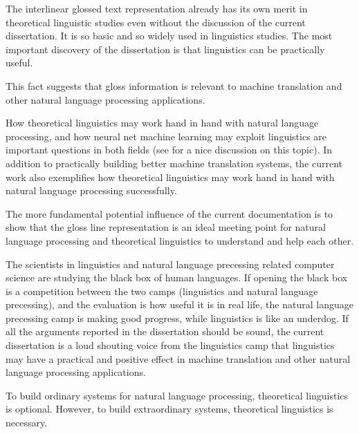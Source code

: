 \documentclass[final]{ua-thesis}
\numberwithin{equation}{section}
\begin{document}
The interlinear glossed text representation already has its own merit in theoretical linguistic studies even without the discussion of the current dissertation. It is so basic and so widely used in linguistics studies. The most important discovery of the dissertation is that linguistics can be practically useful.

This fact suggests that gloss information is relevant to machine translation and other natural language processing applications. 

How theoretical linguistics may work hand in hand with natural language processing, and how neural net machine learning may exploit linguistics are important questions in both fields (see \citet{pater2017generative} for a nice discussion on this topic). In addition to practically building better machine translation systems, the current work also exemplifies how theoretical linguistics may work hand in hand with natural language processing successfully.

The more fundamental potential influence of the current documentation is to show that the gloss line representation is an ideal meeting point for natural language processing and theoretical linguistics to understand and help each other. 

The scientists in linguistics and natural language precessing related computer science are studying the black box of human languages. 
If opening the black box is a competition between the two camps (linguistics and natural language precessing), and the evaluation is how useful it is in real life, the natural language precessing camp is making good progress, while linguistics is like an underdog. 
If all the arguments reported in the dissertation should be sound, the current dissertation is a loud shouting voice from the linguistics camp that linguistics may have a practical and positive effect in machine translation and other natural language processing applications. 

To build ordinary systems for natural language processing, theoretical linguistics is optional. However, to build extraordinary systems, theoretical linguistics is necessary.







\end{document}
